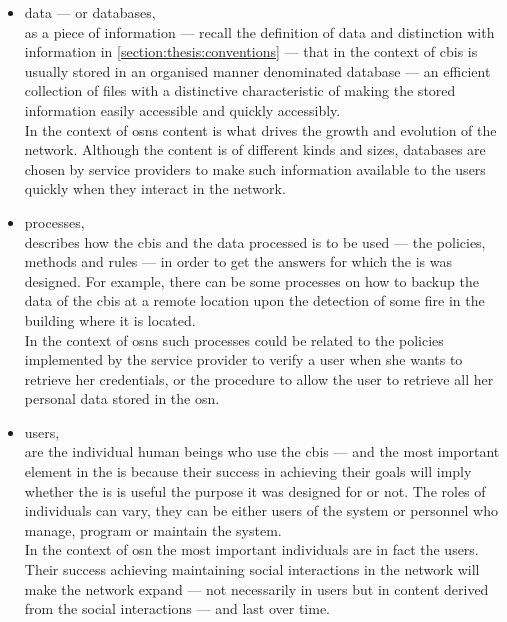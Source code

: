 \begin{itemize}
    \item data --- or databases,\\
    as a piece of information --- recall the definition of data and distinction 
    with information in \cref{section:thesis:conventions} --- that in the context of \ac{cbis}
    is usually stored in an organised manner denominated database --- an efficient 
    collection of files with a distinctive characteristic of making the stored information 
    easily accessible and quickly accessibly.\\
    In the context of \acp{osn} content is what drives the growth and evolution 
    of the network. Although the content is of different kinds and sizes, databases 
    are chosen by service providers to make such information available to the users 
    quickly when they interact in the network.
    
    \item processes,\\
    describes how the \ac{cbis} and the data processed is to be used --- the policies, 
    methods and rules --- in order to get the answers for which the \ac{is} was 
    designed. For example, there can be some processes on how to backup the data 
    of the \ac{cbis} at a remote location upon the detection of some fire in the 
    building where it is located.\\
    In the context of \acp{osn} such processes could be related to the policies 
    implemented by the service provider to verify a user when she wants to retrieve 
    her credentials, or the procedure to allow the user to retrieve all her personal 
    data stored in the \ac{osn}.
    
    \item users,\\
    are the individual human beings who use the \ac{cbis} --- and the most important 
    element in the \ac{is} because their success in achieving their goals will imply 
    whether the \ac{is} is useful the purpose it was designed for or not. The roles 
    of individuals can vary, they can be either users of the system or personnel 
    who manage, program or maintain the system.\\
    In the context of \ac{osn} the most important individuals are in fact the users. 
    Their success achieving maintaining social interactions in the network will 
    make the network expand --- not necessarily in users but in content derived 
    from the social interactions --- and last over time.
    
\end{itemize}

